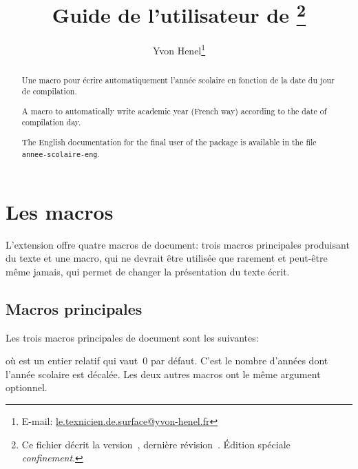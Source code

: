 \documentclass[full]{l3doc}
\begin{document}
\title{Guide de l'utilisateur de \thanks{Ce fichier
    décrit la version~\ExplFileVersion, dernière révision~\ExplFileDate. Édition
  spéciale \emph{confinement}.}}
\author{Yvon Henel\thanks{E-mail:
    \href{mailto:le.texnicien.de.surface@yvon-henel.fr}
    {le.texnicien.de.surface@yvon-henel.fr}}}
\maketitle
\noindent\hrulefill

\begin{abstract}
Une macro  pour écrire automatiquement l'année scolaire en
fonction de la date du jour de compilation.
\end{abstract}

\noindent\hrulefill

 \begin{otherlanguage}{english}
\begin{abstract}
A macro  to automatically write academic year (French way)
according to the date of compilation day.

The English documentation for the final user of the package
 is available in the file \texttt{annee-scolaire-eng}.
\end{abstract}
\end{otherlanguage}

\noindent\hrulefill
\vspace{\baselineskip}


\section{Les macros}
\label{sec:macros}

L'extension  offre quatre macros de document: trois macros
principales produisant du texte et une macro, qui ne devrait être utilisée que
rarement et peut-être même jamais, qui permet de changer la présentation du
texte écrit.

\subsection{Macros principales}
\label{sec:principales}

Les trois macros principales de document sont les suivantes:

\begin{function}{\anneescolaire}
  \begin{syntax}
  \end{syntax}
  où  est un entier relatif qui vaut~\(0\) par défaut.  C'est le
  nombre d'années dont l'année scolaire est décalée. Les deux autres macros ont
  le même argument optionnel.
\end{function}
\end{document}
